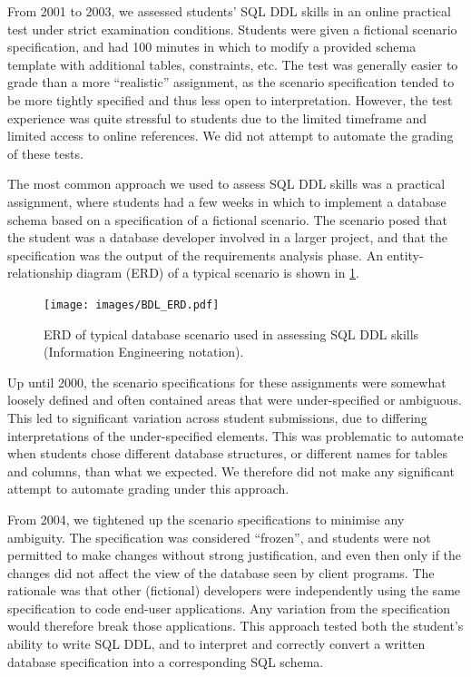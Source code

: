 \documentclass[sigconf, authordraft, capitalise]{acmart}
\begin{document}
From 2001 to 2003, we assessed students' SQL DDL skills in an online practical test under strict examination conditions. Students were given a fictional scenario specification, and had 100 minutes in which to modify a provided schema template with additional tables, constraints, etc. The test was generally easier to grade than a more ``realistic'' assignment, as the scenario specification tended to be more tightly specified and thus less open to interpretation. However, the test experience was quite stressful to students due to the limited timeframe and limited access to online references. We did not attempt to automate the grading of these tests.

The most common approach we used to assess SQL DDL skills was a practical assignment, where students had a few weeks in which to implement a database schema based on a specification of a fictional scenario. The scenario posed that the student was a database developer involved in a larger project, and that the specification was the output of the requirements analysis phase. An entity-relationship diagram (ERD) of a typical scenario is shown in \cref{fig-ERD}.
 
\begin{figure}[hb]
    \centering
    \texttt{[image: images/BDL\_ERD.pdf]} 
    \caption{ERD of typical database scenario used in assessing SQL DDL skills (Information Engineering notation).}
    \label{fig-ERD}
\end{figure}

Up until 2000, the scenario specifications for these assignments were somewhat loosely defined and often contained areas that were under-specified or ambiguous. This led to significant variation across student submissions, due to differing interpretations of the under-specified elements. This was problematic to automate when students chose different database structures, or different names for tables and columns, than what we expected. We therefore did not make any significant attempt to automate grading under this approach.

From 2004, we tightened up the scenario specifications to minimise any ambiguity. The specification was considered ``frozen'', and students were not permitted to make changes without strong justification, and even then only if the changes did not affect the view of the database seen by client programs. The rationale was that other (fictional) developers were independently using the same specification to code end-user applications. Any variation from the specification would therefore break those applications. This approach tested both the student's ability to write SQL DDL, and to interpret and correctly convert a written database specification into a corresponding SQL schema.
\end{document}
